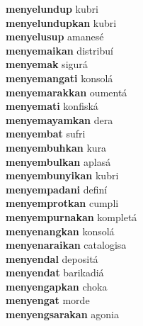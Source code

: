 \textbf{menyelundup } kubri \\
\textbf{menyelundupkan } kubri \\
\textbf{menyelusup } amanesé \\
\textbf{menyemaikan } distribuí \\
\textbf{menyemak } sigurá \\
\textbf{menyemangati } konsolá \\
\textbf{menyemarakkan } oumentá \\
\textbf{menyemati } konfiská \\
\textbf{menyemayamkan } dera \\
\textbf{menyembat } sufri \\
\textbf{menyembuhkan } kura \\
\textbf{menyembulkan } aplasá \\
\textbf{menyembunyikan } kubri \\
\textbf{menyempadani } definí \\
\textbf{menyemprotkan } cumpli \\
\textbf{menyempurnakan } kompletá \\
\textbf{menyenangkan } konsolá \\
\textbf{menyenaraikan } catalogisa \\
\textbf{menyendal } depositá \\
\textbf{menyendat } barikadiá \\
\textbf{menyengapkan } choka \\
\textbf{menyengat } morde \\
\textbf{menyengsarakan } agonia \\
